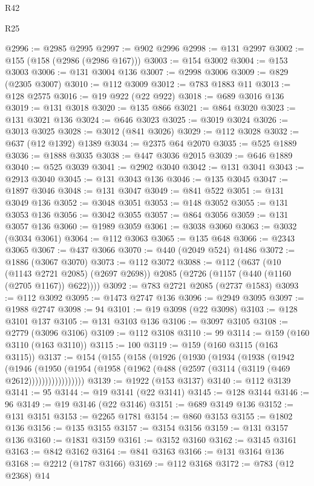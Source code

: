 \begin{lexlean}{R42}
\begin{lexlean}{R25}
\begin{coremodule}
{{{{{{{{{{{{{{{{{{{{{{{{{{{{{{{{{{{{{{{{{{{{{{{{{{{{{{{{{{{{{{{{{{{{{{{{{{{{{{{{{{{{{{{{{{{{{{{{{{{{{{{{{{{{{{{{{{{{{{{{{{{{{{{{{{{{{{{{{{{{{{{{{{{{{{{{{{{{{{{{{{{{{{{{{{{{{{{{{{{{{{{{{{{{{{{{{{{{{{{@2996 := @2985 @2995
@2997 := @902 @2996
@2998 := @131 @2997
@3002 := @155 (@158 (@2986 (@2986 @167)))
@3003 := @154 @3002
@3004 := @153 @3003
@3006 := @131 @3004 @136
@3007 := @2998 @3006
@3009 := @829 (@2305 @3007)
@3010 := @112 @3009
@3012 := @783 @1883 @11
@3013 := @128 @2575
@3016 := @19 @922 (@22 @922)
@3018 := @689 @3016 @136
@3019 := @131 @3018
@3020 := @135 @866
@3021 := @864 @3020
@3023 := @131 @3021 @136
@3024 := @646 @3023
@3025 := @3019 @3024
@3026 := @3013 @3025
@3028 := @3012 (@841 @3026)
@3029 := @112 @3028
@3032 := @637 (@12 @1392) @1389
@3034 := @2375 @64 @2070
@3035 := @525 @1889
@3036 := @1888 @3035
@3038 := @447 @3036 @2015
@3039 := @646 @1889
@3040 := @525 @3039
@3041 := @2902 @3040
@3042 := @131 @3041
@3043 := @2913 @3040
@3045 := @131 @3043 @136
@3046 := @135 @3045
@3047 := @1897 @3046
@3048 := @131 @3047
@3049 := @841 @522
@3051 := @131 @3049 @136
@3052 := @3048 @3051
@3053 := @148 @3052
@3055 := @131 @3053 @136
@3056 := @3042 @3055
@3057 := @864 @3056
@3059 := @131 @3057 @136
@3060 := @1989 @3059
@3061 := @3038 @3060
@3063 := @3032 (@3034 @3061)
@3064 := @112 @3063
@3065 := @135 @648
@3066 := @2343 @3065
@3067 := @437 @3066
@3070 := @440 (@2049 @524) @1486
@3072 := @1886 (@3067 @3070)
@3073 := @112 @3072
@3088 := @112
    (@637
      (@10 (@1143 @2721 @2085) (@2697 @2698))
      @2085
      (@2726 (@1157 (@440 (@1160 (@2705 @1167)) @622))))
@3092 := @783 @2721 @2085 (@2737 @1583)
@3093 := @112 @3092
@3095 := @1473 @2747 @136
@3096 := @2949 @3095
@3097 := @1988 @2747
@3098 := 94
@3101 := @19 @3098 (@22 @3098)
@3103 := @128 @3101 @137
@3105 := @131 @3103 @136
@3106 := @3097 @3105
@3108 := @2779 (@3096 @3106)
@3109 := @112 @3108
@3110 := 99
@3114 := @159 (@160 @3110 (@163 @3110))
@3115 := 100
@3119 := @159 (@160 @3115 (@163 @3115))
@3137 := @154
    (@155
      (@158
        (@1926
          (@1930
            (@1934
              (@1938
                (@1942
                  (@1946
                    (@1950
                      (@1954 (@1958 (@1962 (@488 (@2597 (@3114 (@3119 (@469 @2612)))))))))))))))))
@3139 := @1922 (@153 @3137)
@3140 := @112 @3139
@3141 := 95
@3144 := @19 @3141 (@22 @3141)
@3145 := @128 @3144
@3146 := 96
@3149 := @19 @3146 (@22 @3146)
@3151 := @689 @3149 @136
@3152 := @131 @3151
@3153 := @2265 @1781
@3154 := @860 @3153
@3155 := @1802 @136
@3156 := @135 @3155
@3157 := @3154 @3156
@3159 := @131 @3157 @136
@3160 := @1831 @3159
@3161 := @3152 @3160
@3162 := @3145 @3161
@3163 := @842 @3162
@3164 := @841 @3163
@3166 := @131 @3164 @136
@3168 := @2212 (@1787 @3166)
@3169 := @112 @3168
@3172 := @783 (@12 @2368) @14
}}}}}}}}}}}}}}}}}}}}}}}}}}}}}}}}}}}}}}}}}}}}}}}}}}}}}}}}}}}}}}}}}}}}}}}}}}}}}}}}}}}}}}}}}}}}}}}}}}}}}}}}}}}}}}}}}}}}}}}}}}}}}}}}}}}}}}}}}}}}}}}}}}}}}}}}}}}}}}}}}}}}}}}}}}}}}}}}}}}}}}}}}}}}}}}}}}}}}}}
\end{coremodule}
\end{lexlean}
\end{lexlean}
